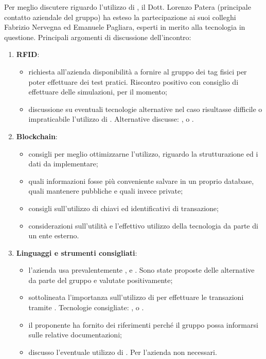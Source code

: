 Per meglio discutere riguardo l'utilizzo di ,  il Dott. Lorenzo Patera (principale contatto aziendale del gruppo) ha esteso la partecipazione ai suoi colleghi Fabrizio Nervegna ed Emanuele Pagliara, esperti in merito alla tecnologia in questione.
Principali argomenti di discussione dell'incontro:
\begin{enumerate}
    \item \textbf{RFID}:
        \begin{itemize}
            \item richiesta all'azienda disponibilità a fornire al gruppo dei tag fisici per poter effettuare dei test pratici. Riscontro positivo con consiglio di effettuare delle simulazioni, per il momento;
            \item discussione su eventuali tecnologie alternative nel caso risultasse difficile o impraticabile l'utilizzo di . Alternative discusse: ,  o .
        \end{itemize}
    \item \textbf{Blockchain}:
        \begin{itemize}
            \item consigli per meglio ottimizzarne l'utilizzo, riguardo la strutturazione ed i dati da implementare;
            \item quali informazioni fosse più conveniente salvare in un proprio database, quali mantenere pubbliche e quali invece private; 
            \item consigli sull'utilizzo di chiavi  ed identificativi di transazione;
            \item considerazioni sull'utilità e l'effettivo utilizzo della tecnologia da parte di un ente esterno.
        \end{itemize}
    \item \textbf{Linguaggi e strumenti consigliati}:\\
        \begin{itemize}
            \item l'azienda usa prevalentemente ,  e . Sono state proposte delle alternative da parte del gruppo e valutate positivamente;
            \item sottolineata l'importanza sull'utilizzo di  per effettuare le transazioni tramite . Tecnologie consigliate: ,  o .
            \item il proponente ha fornito dei riferimenti perché il gruppo possa informarsi sulle relative documentazioni;
            \item discusso l'eventuale utilizzo di . Per l'azienda non necessari.
        \end{itemize}
\end{enumerate}
